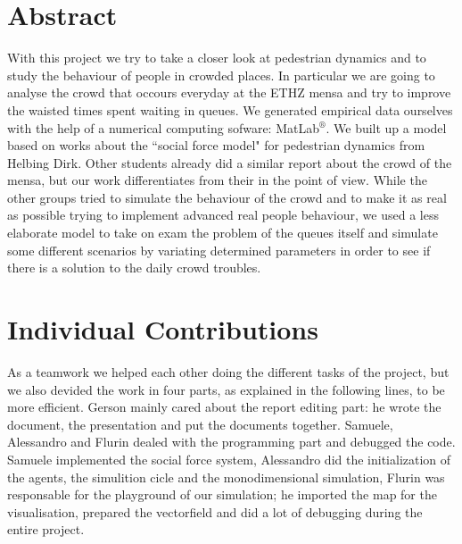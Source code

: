 \documentclass[11pt]{article}
\begin{document}

% 

\newpage


\tableofcontents

\newpage

\listoffigures

\listoftables

\newpage


\section{Abstract}

With this project we try to take a closer look at pedestrian dynamics and to study the behaviour of people in crowded places. In particular we are going to analyse the crowd that occours everyday at the ETHZ mensa and try to improve the waisted times spent waiting in queues. We generated empirical data ourselves with the help of a numerical computing sofware: MatLab$^{®}$. We built up a model based on works about the ``social force model" for pedestrian dynamics from Helbing Dirk. Other students already did a similar report about the crowd of the mensa, but our work differentiates from their in the point of view. While the other groups tried to simulate the behaviour of the crowd and to make it as real as possible trying to implement advanced real people behaviour, we used a less elaborate model to take on exam the problem of the queues itself and simulate some different scenarios by variating determined parameters in order to see if there is a solution to the daily crowd troubles.

\newpage

\section{Individual Contributions}

As a teamwork we helped each other doing the different tasks of the project, but we also devided the work in four parts, as explained in the following lines, to be more efficient. Gerson mainly cared about the report editing part: he wrote the document, the presentation and put the documents together. Samuele, Alessandro and Flurin dealed with the programming part and debugged the code. Samuele implemented the social force system, Alessandro did the initialization of the agents,  the simulition cicle and the monodimensional simulation, Flurin was responsable for the playground of our simulation; he imported the map for the visualisation, prepared the vectorfield and did a lot of debugging during the entire project.
\end{document}
